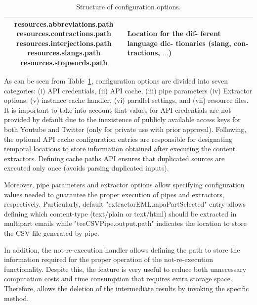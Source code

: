 \begin{table}[H]
\begin{tabularx}{\textwidth}{cccl}
		\midrule
		\makecell[l]{Resource files} & \makecell[l]{resources.abbreviations.path \\ resources.contractions.path\\resources.interjections.path\\resources.slangs.path\\resources.stopwords.path} & \makecell{$\surd$} & \makecell[l]{Location for the dif-\\ferent language dic-\\tionaries (slang, con-\\tractions, $\ldots$)}\\
		\bottomrule
	\end{tabularx}
	\caption{Structure of  configuration options.}
	\label{Table2}
\end{table}

As can be seen from Table~\ref{Table2}, configuration options are divided into seven categories: (i) API credentials, (ii) API cache, (iii) pipe parameters (iv) Extractor options, (v) instance cache handler, (vi) parallel settings, and (vii) resource files. It is important to take into account that values for API credentials are not provided by default due to the inexistence of publicly available access keys for both Youtube and Twitter (only for private use with prior approval). Following, the optional API cache configuration entries are responsible for designating temporal locations to store information obtained after executing the content extractors. Defining cache paths API ensures that duplicated sources are executed only once (avoids parsing duplicated inputs). 

Moreover, pipe parameters and extractor options allow specifying configuration values needed to guarantee the proper execution of pipes and extractors, respectively. Particularly, default "extractorEML.mpaPartSelected" entry allows defining which content-type (text/plain or text/html) should be extracted in multipart emails while "teeCSVPipe.output.path" indicates the location to store the CSV file generated by  pipe. 

In addition, the not-re-execution handler allows defining the path to store the information required for the proper operation of the not-re-execution functionality. Despite this, the feature is very useful to reduce both unnecessary computation costs and time consumption that requires extra storage space. Therefore,  allows the deletion of the intermediate results by invoking the specific  method.

